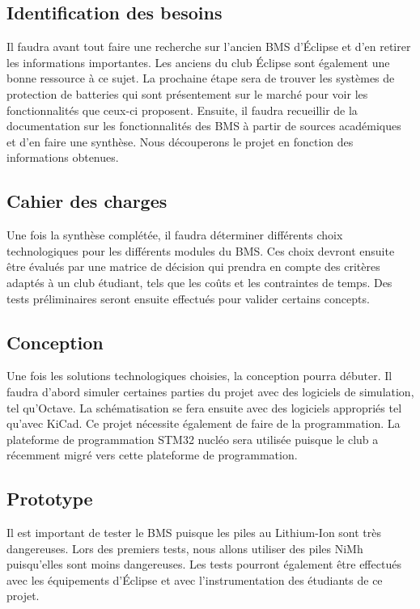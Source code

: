 \subsection{Identification des besoins}
Il faudra avant tout faire une recherche sur l’ancien BMS d’Éclipse et d’en retirer les informations importantes. Les anciens du club Éclipse sont également une bonne ressource à ce sujet. La prochaine étape sera de trouver les systèmes de protection de batteries qui sont présentement sur le marché pour voir les fonctionnalités que ceux-ci proposent. Ensuite, il faudra recueillir de la documentation sur les fonctionnalités des BMS à partir de sources académiques et d’en faire une synthèse. Nous découperons le projet en fonction des informations obtenues. 

\subsection{Cahier des charges}
Une fois la synthèse complétée, il faudra déterminer différents choix technologiques pour les différents modules du BMS. Ces choix devront ensuite être évalués par une matrice de décision qui prendra en compte des critères adaptés à un club étudiant, tels que les coûts et les contraintes de temps. Des tests préliminaires seront ensuite effectués pour valider certains concepts.

\subsection{Conception}
Une fois les solutions technologiques choisies, la conception pourra débuter. Il faudra d’abord simuler certaines parties du projet avec des logiciels de simulation, tel qu’Octave. La schématisation se fera ensuite avec des logiciels appropriés tel qu’avec KiCad. Ce projet nécessite également de faire de la programmation. La plateforme de programmation STM32 nucléo sera utilisée puisque le club a récemment migré vers cette plateforme de programmation.

\subsection{Prototype}
Il est important de tester le BMS puisque les piles au Lithium-Ion sont très dangereuses. Lors des premiers tests, nous allons utiliser des piles NiMh puisqu’elles sont moins dangereuses. Les tests pourront également être effectués avec les équipements d’Éclipse et avec l’instrumentation des étudiants de ce projet.
